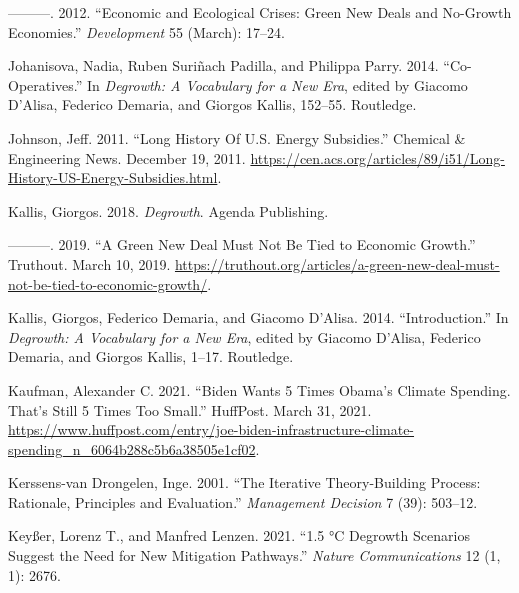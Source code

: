 \documentclass[a4paper, nobind]{templates/ociamthesis}
\newlength{\cslhangindent}
\newenvironment{CSLReferences}[2] %
 {%
  \setlength{\parindent}{0pt}
  \ifodd #1
  \let\oldpar\par
  \def\par{\hangindent=\cslhangindent\oldpar}
  \fi
  \setlength{\parskip}{1mm}
  \setlength{\baselineskip}{6mm}
 }%
 {}
\begin{document}
\begin{CSLReferences}{1}{0}
\leavevmode{}%
---------. 2012. {``Economic and {Ecological Crises}: {Green} New Deals and No-Growth Economies.''} \emph{Development} 55 (March): 17--24.

\leavevmode{}%
Johanisova, Nadia, Ruben Suriñach Padilla, and Philippa Parry. 2014. {``Co-Operatives.''} In \emph{Degrowth: {A Vocabulary} for a {New Era}}, edited by Giacomo D'Alisa, Federico Demaria, and Giorgos Kallis, 152--55. {Routledge}.

\leavevmode{}%
Johnson, Jeff. 2011. {``Long {History Of U}.{S}. {Energy Subsidies}.''} {Chemical \& Engineering News}. December 19, 2011. \url{https://cen.acs.org/articles/89/i51/Long-History-US-Energy-Subsidies.html}.

\leavevmode{}%
Kallis, Giorgos. 2018. \emph{Degrowth}. {Agenda Publishing}.

\leavevmode{}%
---------. 2019. {``A {Green New Deal Must Not Be Tied} to {Economic Growth}.''} {Truthout}. March 10, 2019. \url{https://truthout.org/articles/a-green-new-deal-must-not-be-tied-to-economic-growth/}.

\leavevmode{}%
Kallis, Giorgos, Federico Demaria, and Giacomo D'Alisa. 2014. {``Introduction.''} In \emph{Degrowth: {A Vocabulary} for a {New Era}}, edited by Giacomo D'Alisa, Federico Demaria, and Giorgos Kallis, 1--17. {Routledge}.

\leavevmode{}%
Kaufman, Alexander C. 2021. {``Biden {Wants} 5 {Times Obama}'s {Climate Spending}. {That}'s {Still} 5 {Times Too Small}.''} {HuffPost}. March 31, 2021. \url{https://www.huffpost.com/entry/joe-biden-infrastructure-climate-spending_n_6064b288c5b6a38505e1cf02}.

\leavevmode{}%
Kerssens-van Drongelen, Inge. 2001. {``The Iterative Theory-Building Process: Rationale, Principles and Evaluation.''} \emph{Management Decision} 7 (39): 503--12.

\leavevmode{}%
Keyßer, Lorenz T., and Manfred Lenzen. 2021. {``1.5 °{C} Degrowth Scenarios Suggest the Need for New Mitigation Pathways.''} \emph{Nature Communications} 12 (1, 1): 2676.


\end{CSLReferences}
\end{document}
